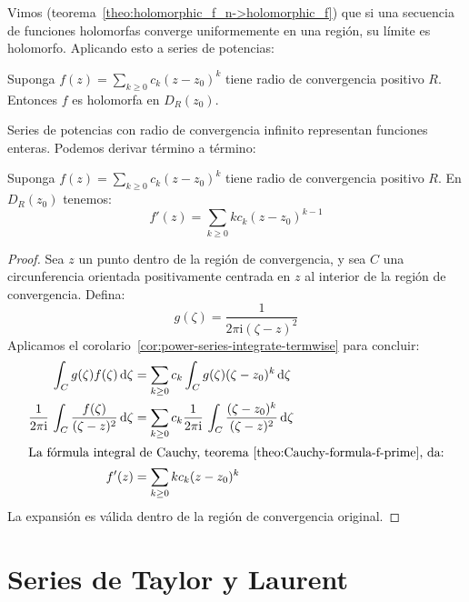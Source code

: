   Vimos
  (teorema~\ref{theo:holomorphic_f_n->holomorphic_f})
  que si una secuencia de funciones holomorfas
  converge uniformemente
  en una región,
  su límite es holomorfo.
  Aplicando esto a series de potencias:
  \begin{corollary}
    \label{cor:holomorphic=>analytic}
    Suponga \(f(z) = \sum_{k \ge 0} c_k (z - z_0)^k\)
    tiene radio de convergencia positivo \(R\).
    Entonces \(f\) es holomorfa en \(D_R(z_0)\).
  \end{corollary}
  Series de potencias con radio de convergencia infinito
  representan funciones enteras.
  Podemos derivar término a término:
  \begin{theorem}
    \label{theo:complex-series-differentiate-termwise}
    Suponga \(f(z) = \sum_{k \ge 0} c_k (z - z_0)^k\)
    tiene radio de convergencia positivo \(R\).
    En \(D_R(z_0)\) tenemos:
    \begin{equation*}
      f'(z)
	= \sum_{k \ge 0} k c_k (z - z_0)^{k - 1}
    \end{equation*}
  \end{theorem}
  \begin{proof}
    Sea \(z\) un punto dentro de la región de convergencia,
    y sea \(C\) una circunferencia orientada positivamente
    centrada en \(z\) al interior de la región de convergencia.
    Defina:
    \begin{equation*}
      g(\zeta)
	= \frac{1}{2 \pi \mathrm{i} (\zeta - z)^2}
    \end{equation*}
    Aplicamos el corolario~\ref{cor:power-series-integrate-termwise}
    para concluir:
    \begin{align*}
      \int_C g(\zeta) f(\zeta) \, \mathrm{d} \zeta
	&= \sum_{k \ge 0}
	     c_k \int_C g(\zeta) (\zeta - z_0)^k
	       \, \mathrm{d} \zeta \\
      \frac{1}{2 \pi \mathrm{i}} \,
	\int_C \frac{f(\zeta)}{(\zeta - z)^2} \, \mathrm{d} \zeta
	&= \sum_{k \ge 0} c_k \frac{1}{2 \pi \mathrm{i}} \,
	     \int_C \frac{(\zeta - z_0)^k}{(\zeta - z)^2}
	       \, \mathrm{d} \zeta \\
    \intertext{La fórmula integral de Cauchy,
	       teorema~\ref{theo:Cauchy-formula-f-prime},
	       da:}
      f'(z)
	&= \sum_{k \ge 0} k c_k (z - z_0)^k
    \end{align*}
    La expansión es válida
    dentro de la región de convergencia original.
  \end{proof}

\section{Series de Taylor y Laurent}
\label{sec:Taylor-Laurent-series}

